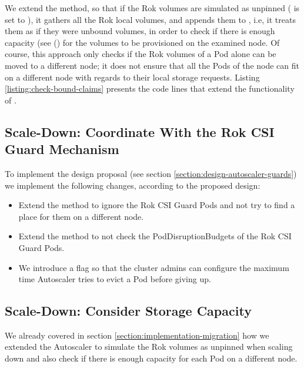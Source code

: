 We extend the  method, so that if the Rok volumes are
simulated as unpinned ( is set to ), it
gathers all the Rok local volumes, and appends them to ,
i.e, it treats them as if they were unbound volumes, in order to check if there
is enough capacity (see () for the volumes to be
provisioned on the examined node. Of course, this approach only checks if the
Rok volumes of a Pod alone can be moved to a different node; it does not ensure
that all the Pods of the node can fit on a different node with regards to their
local storage requests. Listing \ref{listing:check-bound-claims} presents the
code lines that extend the functionality of .




\subsection{Scale-Down: Coordinate With the Rok CSI Guard Mechanism}


To implement the design proposal (see section
\ref{section:design-autoscaler-guards}) we implement the following changes,
according to the proposed design:
\begin{itemize}
      \tightlist
      \item Extend the  method to ignore the Rok CSI
            Guard Pods and not try to find a place for them on a different node.
      \item Extend the  method to not check the PodDisruptionBudgets
            of the Rok CSI Guard Pods.
      \item We introduce a flag   so that the
      cluster admins can configure the maximum time Autoscaler tries to evict a Pod
      before giving up.
\end{itemize}





\subsection{Scale-Down: Consider Storage Capacity}
We already covered in section \ref{section:implementation-migration} how we
extended the Autoscaler to simulate the Rok volumes as unpinned when scaling
down and also check if there is enough capacity for each Pod on a different
node.

